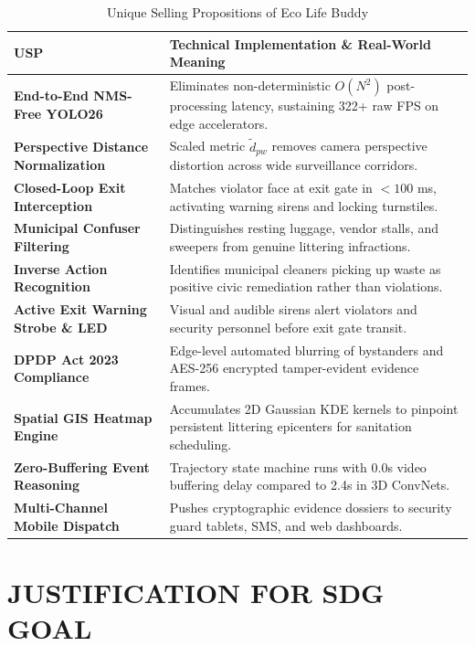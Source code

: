 \documentclass[12pt,a4paper]{report}
\begin{document}
\begin{table}[htbp]
\centering
\caption{Unique Selling Propositions of Eco Life Buddy}
\label{tab:usp}
\begin{tabularx}{\textwidth}{lX}
\toprule
\textbf{USP} & \textbf{Technical Implementation \& Real-World Meaning} \\
\midrule
\textbf{End-to-End NMS-Free YOLO26} & Eliminates non-deterministic $O(N^2)$ post-processing latency, sustaining 322+ raw FPS on edge accelerators. \\
\textbf{Perspective Distance Normalization} & Scaled metric $\tilde{d}_{pw}$ removes camera perspective distortion across wide surveillance corridors. \\
\textbf{Closed-Loop Exit Interception} & Matches violator face at exit gate in $<100$ ms, activating warning sirens and locking turnstiles. \\
\textbf{Municipal Confuser Filtering} & Distinguishes resting luggage, vendor stalls, and sweepers from genuine littering infractions. \\
\textbf{Inverse Action Recognition} & Identifies municipal cleaners picking up waste as positive civic remediation rather than violations. \\
\textbf{Active Exit Warning Strobe \& LED} & Visual and audible sirens alert violators and security personnel before exit gate transit. \\
\textbf{DPDP Act 2023 Compliance} & Edge-level automated blurring of bystanders and AES-256 encrypted tamper-evident evidence frames. \\
\textbf{Spatial GIS Heatmap Engine} & Accumulates 2D Gaussian KDE kernels to pinpoint persistent littering epicenters for sanitation scheduling. \\
\textbf{Zero-Buffering Event Reasoning} & Trajectory state machine runs with 0.0s video buffering delay compared to 2.4s in 3D ConvNets. \\
\textbf{Multi-Channel Mobile Dispatch} & Pushes cryptographic evidence dossiers to security guard tablets, SMS, and web dashboards. \\
\bottomrule
\end{tabularx}
\end{table}

\newpage
\chapter{JUSTIFICATION FOR SDG GOAL}
\end{document}
